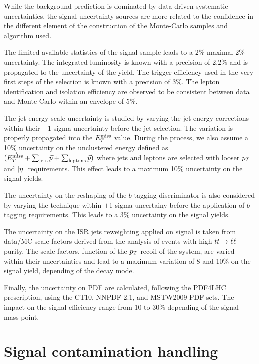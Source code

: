         While the background prediction is dominated by data-driven systematic
        uncertainties, the signal uncertainty sources are more related to the
        confidence in the different element of the construction of the Monte-Carlo
        samples and algorithm used.

        The limited available statistics of the signal sample leads to a 2\% maximal
        2\% uncertainty. The integrated luminosity is known with a precision of 2.2\%
        and is propagated to the uncertainty of the yield. The trigger efficiency
        used in the very first steps of the selection is known with a precision of 3\%.
        The lepton identification and isolation efficiency are observed to be consistent
        between data and Monte-Carlo within an envelope of 5\%.

        The jet energy scale uncertainty is studied by varying the jet energy corrections
        within their $\pm$1 sigma uncertainty before the jet selection. The variation is
        properly propagated into the $E_T^\text{miss}$ value. During the process, we also assume a 
        10\% uncertainty on the unclustered energy defined as $(\vec{E_T^\text{miss}} + \sum_\text{jets}
        \vec{p} + \sum_\text{leptons} \vec{p})$ where jets and leptons are selected with looser
        $p_T$ and $\left| \eta \right|$ requirements. This effect leads to a maximum 10\% uncertainty on
        the signal yields.

        The uncertainty on the reshaping of the $b$-tagging discriminator is also considered
        by varying the technique within $\pm$1 sigma uncertainy before the application of
        $b$-tagging requirements. This leads to a 3\% uncertainty on the signal yields.

        The uncertainty on the ISR jets reweighting applied on signal is taken from data/MC
        scale factors derived from the analysis of events with high $t\bar{t} \rightarrow \ell \ell$ purity. The
        scale factors, function of the $p_T$ recoil of the system, are varied within their
        uncertainties and lead to a maximum variation of 8 and 10\% on the signal yield, depending
        of the decay mode.

        Finally, the uncertainty on PDF are calculated, following the PDF4LHC prescription,
        using the CT10, NNPDF 2.1, and MSTW2009 PDF sets.  The impact on the
        signal efficiency range from 10 to 30\% depending of the signal mass point. 

    \section{Signal contamination handling}

